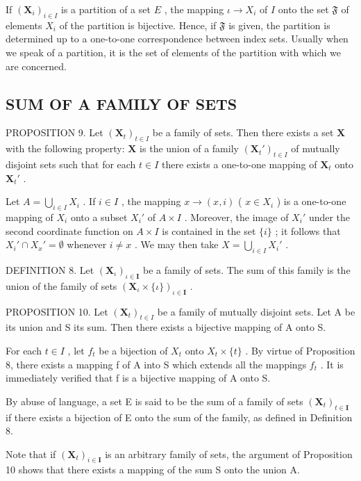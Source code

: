 If \((\mathbf{X}_i)_{i\in I}\) is a partition of a set \(E\) , the mapping \(\iota \to X_i\) of \(I\) onto the set \(\mathfrak{F}\) of elements \(X_i\) of the partition is bijective. Hence, if \(\mathfrak{F}\) is given, the partition is determined up to a one-to-one correspondence between index sets. Usually when we speak of a partition, it is the set of elements of the partition with which we are concerned.

\subsection{SUM OF A FAMILY OF SETS}

PROPOSITION 9. Let \((\mathbf{X}_t)_{t \in I}\) be a family of sets. Then there exists a set \(\mathbf{X}\) with the following property: \(\mathbf{X}\) is the union of a family \((\mathbf{X}_t')_{t \in I}\) of mutually disjoint sets such that for each \(t \in I\) there exists a one-to-one mapping of \(\mathbf{X}_t\) onto \(\mathbf{X}_t'\) .

Let \(A = \bigcup_{i \in I} X_i\) . If \(i \in I\) , the mapping \(x \to (x, i)\) ( \(x \in X_i\) ) is a one-to-one mapping of \(X_i\) onto a subset \(X_i'\) of \(A \times I\) . Moreover, the image of \(X_i'\) under the second coordinate function on \(A \times I\) is contained in the set \(\{i\}\) ; it follows that \(X_i' \cap X_x' = \emptyset\) whenever \(i \neq x\) . We may then take \(X = \bigcup_{i \in I} X_i'\) .

DEFINITION 8. Let \((\mathbf{X}_{\iota})_{\iota \in \mathbf{I}}\) be a family of sets. The sum of this family is the union of the family of sets \((\mathbf{X}_{\iota} \times \{\iota\})_{\iota \in \mathbf{I}}\) .

PROPOSITION 10. Let \((\mathbf{X}_t)_{t\in I}\) be a family of mutually disjoint sets. Let A be its union and S its sum. Then there exists a bijective mapping of A onto S.

For each \(t \in I\) , let \(f_{t}\) be a bijection of \(X_{t}\) onto \(X_{t} \times \{t\}\) . By virtue of Proposition 8, there exists a mapping f of A into S which extends all the mappings \(f_{t}\) . It is immediately verified that f is a bijective mapping of A onto S.

By abuse of language, a set E is said to be the sum of a family of sets \((\mathbf{X}_{t})_{t\in\mathbf{I}}\) if there exists a bijection of E onto the sum of the family, as defined in Definition 8.

Note that if \((\mathbf{X}_{t})_{i\in\mathbf{I}}\) is an arbitrary family of sets, the argument of Proposition 10 shows that there exists a mapping of the sum S onto the union A.

